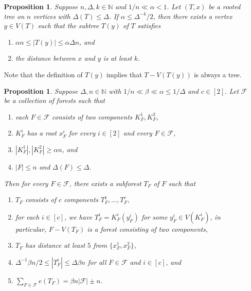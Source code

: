 \documentclass[a4paper, 11pt, reqno]{amsart}
\newtheorem{proposition}[definition]{Proposition}
\numberwithin{equation}{section}
\newcommand{\1}{{\rm 1\hspace*{-0.4ex}%
\rule{0.1ex}{1.52ex}\hspace*{0.2ex}}}
\newcommand{\N}{\mathbb N}
\newcommand{\cF}{\mathcal{F}}
\newcommand{\COMMENT}[1]{}
\begin{document}
\begin{proposition}\label{prop: tree 2 parts}
Suppose $n, \Delta,k \in \N$ and $1/n\ll \alpha<1$.
Let $(T,x)$ be a rooted tree on $n$ vertices with $\Delta(T)\leq \Delta$. 
If $\alpha \leq \Delta^{-k}/2$, then there exists a vertex $y\in V(T)$ such that the subtree $T(y)$ of $T$ satisfies
\begin{enumerate}[label=(\Roman*)]
	\item $\alpha n \leq |T(y)|\leq \alpha \Delta n $, and
	\item the distance between $x$ and $y$ is at least $k$.
\end{enumerate}
\end{proposition}
Note that the definition of $T(y)$ implies that $T-V(T(y))$ is always a tree.
\COMMENT{
Let $x$ be the root of $T$. Note that for $u\in V(T)$, there exists a child $u'$ of $u$ such that $|T(u)|/\Delta \leq |T(u')| < |T(u)|$. 
Let $x=u_0$, and for each $u_i$ we choose $u_{i+1}$ such that $|T(u_i)|/\Delta \leq |T(u_{i+1})| < |T(u_{i})|$. 
Then there exists $t$ such that $T(u_{t})$ satisfies (I).  
Since $\alpha \leq \Delta^{-k}/2$, $t\geq k$. Thus we have (II).
}
\begin{proposition}\label{prop: taking subtree collection}
Suppose $\Delta,n\in \N$ with $1/n \ll \beta \ll \alpha\leq 1/\Delta$ and $c\in [2]$. 
Let $\cF$ be a collection of forests such that
\begin{enumerate}[label=(\roman*)]
\item each $F\in \cF$ consists of two components $K_F^1, K_F^2$,
\item $K_F^i$ has a root $x_F^i$ for every $i\in [2]$ and every $F\in \cF$,
\item $|K_F^1|, |K_F^2|\geq \alpha n$, and
\item $|F|\leq n$ and $\Delta(F)\leq \Delta$.
\end{enumerate}
Then for every $F\in \cF$, there exists a subforest $T_F$ of $F$ such that 
\begin{enumerate}[label=(\Roman*)]
\item $T_F$ consists of $c$ components $T_F^1,\dots,T_F^c$, 
\item for each $i\in [c]$, we have $T_F^i=K^i_F(y_F^i)$ for some $y_F^i\in V(K_F^i)$, 
in particular, $F-V(T_F)$ is a forest consisting of two components,
\item $T_F$ has distance at least $5$ from $\{x_F^1, x_F^2\}$,
\item $\Delta^{-1} \beta n/2 \leq |T_F^{i}|\leq \Delta\beta n$ for all $F\in \cF$ and $i\in [c]$, and
\item $\sum_{F\in \cF} e(T_F) = \beta  n |\cF| \pm n$.
\end{enumerate}
\end{proposition}
\end{document}
